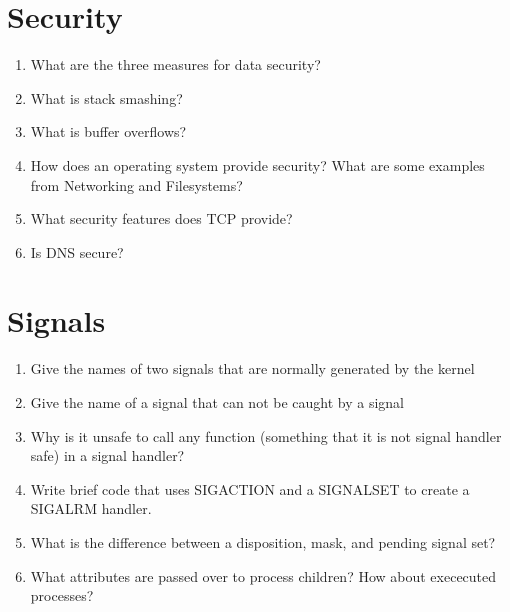 \section{Security}

\begin{enumerate}
\item What are the three measures for data security?
\item What is stack smashing?
\item What is buffer overflows?
\item How does an operating system provide security? What are some examples from Networking and Filesystems?
\item What security features does TCP provide?
\item Is DNS secure?
\end{enumerate}

\section{Signals}

\begin{enumerate}
\item Give the names of two signals that are normally generated by the kernel
\item Give the name of a signal that can not be caught by a signal
\item Why is it unsafe to call any function (something that it is not signal handler safe) in a signal handler?
\item Write brief code that uses SIGACTION and a SIGNALSET to create a SIGALRM handler.
\item What is the difference between a disposition, mask, and pending signal set?
\item What attributes are passed over to process children? How about exececuted processes?
\end{enumerate}
